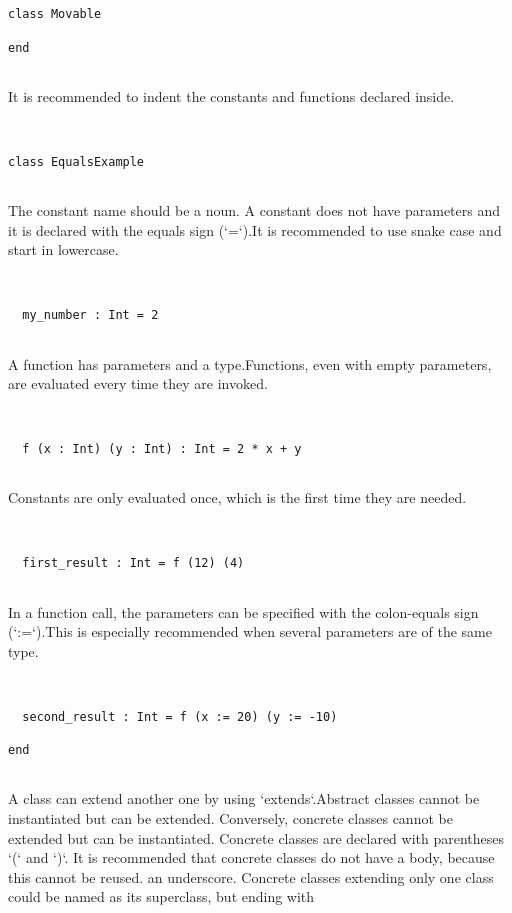 \documentclass[12pt,a4paper]{article}
\begin{document}
\begin{lstlisting}


class Movable

end


\end{lstlisting}

It is recommended to indent the constants and functions declared inside. 


\begin{lstlisting}


class EqualsExample


\end{lstlisting}

The constant name should be a noun. A constant does not have parameters and it is declared with the equals sign (`=`).It is recommended to use snake case and start in lowercase.


\begin{lstlisting}


  my_number : Int = 2


\end{lstlisting}

A function has parameters and a type.Functions, even with empty parameters, are evaluated every time they are invoked. 


\begin{lstlisting}


  f (x : Int) (y : Int) : Int = 2 * x + y


\end{lstlisting}

Constants are only evaluated once, which is the first time they are needed. 


\begin{lstlisting}


  first_result : Int = f (12) (4)


\end{lstlisting}

In a function call, the parameters can be specified with the colon-equals sign (`:=`).This is especially recommended when several parameters are of the same type. 


\begin{lstlisting}


  second_result : Int = f (x := 20) (y := -10)

end


\end{lstlisting}

A class can extend another one by using `extends`.Abstract classes cannot be instantiated but can be extended.
Conversely, concrete classes cannot be extended but can be instantiated.
Concrete classes are declared with parentheses `(` and `)`.
It is recommended that concrete classes do not have a body, because this cannot be reused.
an underscore. Concrete classes extending only one class could be named as its superclass, but ending with
\end{document}
